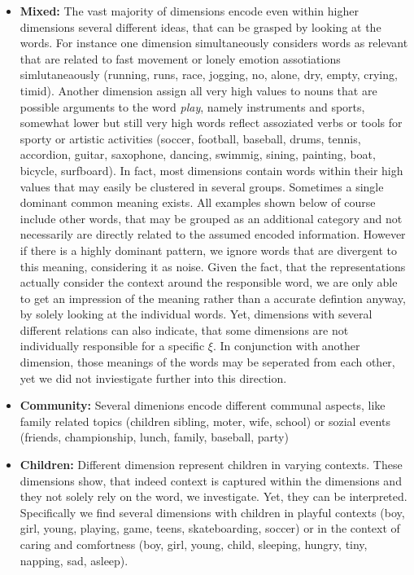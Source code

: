\begin{itemize}
\item \textbf{Mixed:} The vast majority of dimensions encode even within higher dimensions several different ideas, that can be grasped by looking at the words. For instance one dimension simultaneously considers words as relevant that are related to fast movement or lonely emotion assotiations simlutaneaously (running, runs, race, jogging, no, alone, dry, empty, crying, timid). Another dimension assign all very high values to nouns that are possible arguments to the word \textit{play}, namely instruments and sports, somewhat lower but still very high words reflect assoziated verbs or tools for sporty or artistic activities (soccer, football, baseball, drums, tennis, accordion, guitar, saxophone, dancing, swimmig, sining, painting, boat, bicycle, surfboard). In fact, most dimensions contain words within their high values that may easily be clustered in several groups. Sometimes a single dominant common meaning exists. All examples shown below of course include other words, that may be grouped as an additional category and not necessarily are directly related to the assumed encoded information. However if there is a highly dominant pattern, we ignore words that are divergent to this meaning, considering it as noise. Given the fact, that the representations actually consider the context around the responsible word, we are only able to get an impression of the meaning rather than a accurate defintion anyway, by solely looking at the individual words. Yet, dimensions with several different relations can also indicate, that some dimensions are not individually responsible for a specific $\xi$. In conjunction with another dimension, those meanings of the words may be seperated from each other, yet we did not inviestigate further into this direction.
\item \textbf{Community:} Several dimenions encode different communal aspects, like family related topics (children sibling, moter, wife, school) or sozial events (friends, championship, lunch, family, baseball, party)
\item \textbf{Children:} Different dimension represent children in varying contexts. These dimensions show, that indeed context is captured within the dimensions and they not solely rely on the word, we investigate. Yet, they can be interpreted. Specifically we find several dimensions with children in playful contexts (boy, girl, young, playing, game, teens, skateboarding, soccer) or in the context of caring and comfortness (boy, girl, young, child, sleeping, hungry, tiny, napping, sad, asleep).

\end{itemize}
